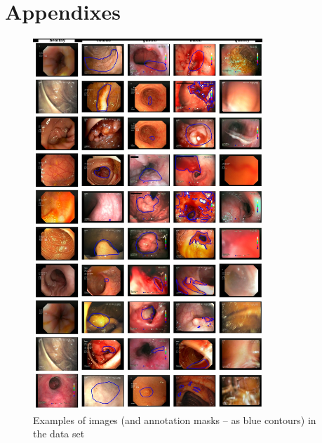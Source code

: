 \documentclass[preprint]{article}
\newif\ifappendix
\renewcommand{\onecolumn}{}
\newcommand{\tabletextsize}{\tiny}
\begin{document}



\ifappendix

\onecolumn

\section*{Appendixes}


\begin{figure}[ht]
    \centering
    \includegraphics[width=\textwidth,height=14cm,keepaspectratio]{samples}
    \caption{Examples of images (and annotation masks -- as blue contours) in the data set}
    \label{fig:example_images}
\end{figure}









\tabletextsize
\end{document}
